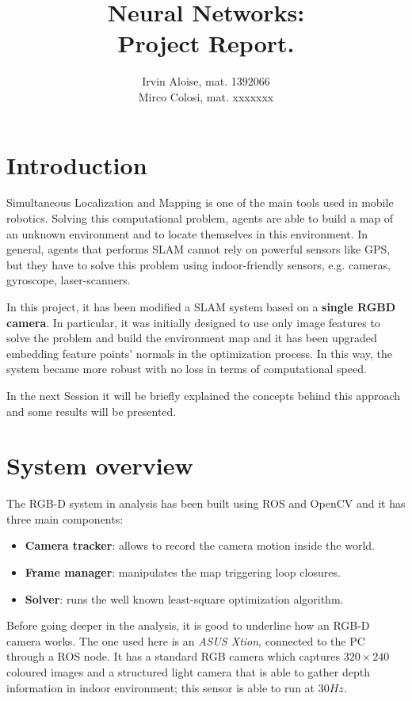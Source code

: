 \documentclass[a4paper]{article}
\title{ Neural Networks: \\
	Project Report.}
\author{Irvin Aloise, mat. 1392066\\
	Mirco Colosi, mat. xxxxxxx}
\begin{document}
	
	\maketitle
	
	\section{Introduction}
	\lettrine[lines=3]{S}{}imultaneous Localization and Mapping is one of the main tools used in mobile robotics. Solving this computational problem, agents are able to build a map of an unknown environment and to locate themselves in this environment. In general, agents that performs SLAM cannot rely on powerful sensors like GPS, but they have to solve this problem using indoor-friendly sensors, e.g. cameras, gyroscope, laser-scanners.
	
	In this project, it has been modified a SLAM system based on a \textbf{single RGBD camera}. In particular, it was initially designed to use only image features to solve the problem and build the environment map and it has been upgraded embedding feature points' normals in the optimization process. In this way, the system became more robust with no loss in terms of computational speed.
	
	In the next Session it will be briefly explained the concepts behind this approach and some results will be presented.
	
	\section{System overview}
	The RGB-D system in analysis has been built using ROS and OpenCV and it has three main components:
	\begin{itemize}
		\item \textbf{Camera tracker}: allows to record the camera motion inside the world.
		\item \textbf{Frame manager}: manipulates the map triggering loop closures.
		\item \textbf{Solver}: runs the well known least-square optimization algorithm.
	\end{itemize}
	Before going deeper in the analysis, it is good to underline how an RGB-D camera works. The one used here is an \textit{ASUS Xtion}, connected to the PC through a ROS node. It has a standard RGB camera which captures $320 \times 240$ coloured images and a structured light camera that is able to gather depth information in indoor environment; this sensor is able to run at $30 Hz$.
	
\end{document}
